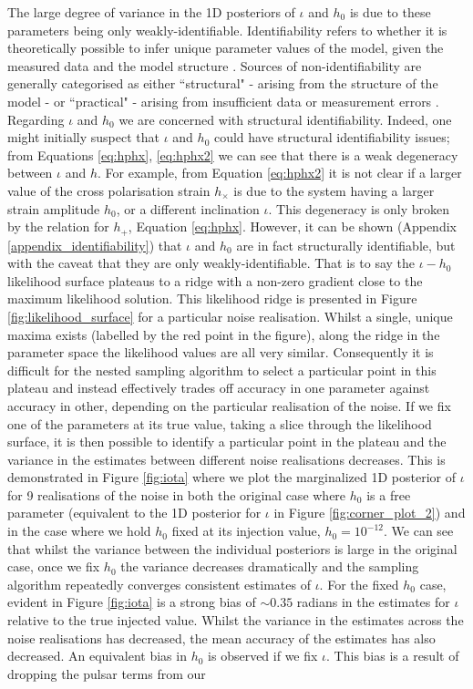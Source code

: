\documentclass[fleqn,usenatbib,useAMS]{mnras}
\begin{document}
The large degree of variance in the 1D posteriors of $\iota$ and $h_0$ is due to these parameters being only weakly-identifiable. Identifiability refers to whether it is theoretically possible to infer unique parameter values of the model, given the measured data and the model structure \citep{e5be7c83a0d24500826f6e1b414d1733}. Sources of non-identifiability are generally categorised as either ``structural" - arising from the structure of the model - or ``practical" - arising from insufficient data or measurement errors \citep{GUILLAUME2019418}. Regarding $\iota$ and $h_0$ we are concerned with structural identifiability. Indeed, one might initially suspect that $\iota$ and $h_0$ could have structural identifiability issues; from Equations \ref{eq:hphx}, \ref{eq:hphx2} we can see that there is a weak degeneracy between $\iota$ and $h$. For example, from Equation \eqref{eq:hphx2} it is not clear if a larger value of the cross polarisation strain $h_{\times}$ is due to the system having a larger strain amplitude $h_0$, or a different inclination $\iota$. This degeneracy is only broken by the relation for $h_{+}$, Equation \eqref{eq:hphx}. However, it can be shown (Appendix \ref{appendix_identifiability}) that $\iota$ and $h_0$ are in fact structurally identifiable, but with the caveat that they are only weakly-identifiable. That is to say the $\iota-h_0$ likelihood surface plateaus to a ridge with a non-zero gradient close to the maximum likelihood solution. This likelihood ridge is presented in Figure \ref{fig:likelihood_surface} for a particular noise realisation. Whilst a single, unique maxima exists (labelled by the red point in the figure), along the ridge in the parameter space the likelihood values are all very similar. Consequently it is difficult for the nested sampling algorithm to select a particular point in this plateau and instead effectively trades off accuracy in one parameter against accuracy in other, depending on the particular realisation of the noise. If we fix one of the parameters at its true value, taking a slice through the likelihood surface, it is then possible to identify a particular point in the plateau and the variance in the estimates between different noise realisations decreases. This is demonstrated in Figure \ref{fig:iota} where we plot the marginalized 1D posterior of $\iota$ for 9 realisations of the noise in both the original case where $h_0$ is a free parameter (equivalent to the 1D posterior for $\iota$ in Figure \ref{fig:corner_plot_2}) and in the case where we hold $h_0$ fixed at its injection value, $h_0 = 10^{-12}$. We can see that whilst the variance between the individual posteriors is large in the original case, once we fix $h_0$ the variance decreases dramatically and the sampling algorithm repeatedly converges consistent estimates of $\iota$. For the fixed $h_0$ case, evident in Figure \ref{fig:iota} is a strong bias of $\sim 0.35$ radians in the estimates for $\iota$ relative to the true injected value. Whilst the variance in the estimates across the noise realisations has decreased, the mean accuracy of the estimates has also decreased. An equivalent bias in $h_0$ is observed if we fix $\iota$. This bias is a result of dropping the pulsar terms from our 
\end{document}
